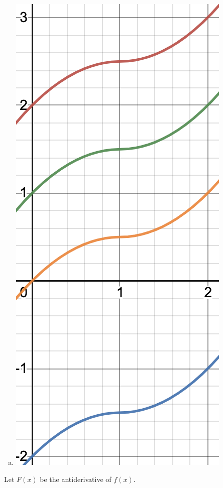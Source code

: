 \documentclass[11pt]{exam}
\begin{document}
\begin{questions}
\begin{solution}
\begin{multicols}{2}
\begin{enumerate}[(a)]
    \item \includegraphics[scale=0.7]{Figures/1d}
    \end{enumerate}
  \end{multicols}
\end{solution}
\question Let \(F(x)\) be the antiderivative of \(f(x)\).
\end{questions}
\end{document}
